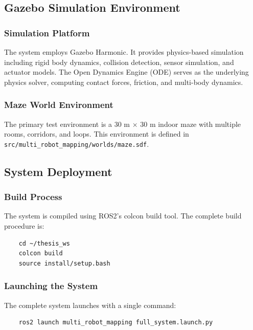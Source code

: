 \documentclass[11pt]{article}
\begin{document}
\subsection{Gazebo Simulation Environment}

\subsubsection{Simulation Platform}

The system employs Gazebo Harmonic. It provides physics-based simulation including rigid body dynamics, collision detection, sensor simulation, and actuator models. The Open Dynamics Engine (ODE) serves as the underlying physics solver, computing contact forces, friction, and multi-body dynamics.

\subsubsection{Maze World Environment}

The primary test environment is a 30 m × 30 m indoor maze with multiple rooms, corridors, and loops. This environment is defined in \texttt{src/multi\_robot\_mapping/worlds/maze.sdf}.

\subsection{System Deployment}

\subsubsection{Build Process}

The system is compiled using ROS2's colcon build tool. The complete build procedure is:

\begin{verbatim}
	cd ~/thesis_ws
	colcon build 
	source install/setup.bash
\end{verbatim}

\subsubsection{Launching the System}

The complete system launches with a single command:

\begin{verbatim}
	ros2 launch multi_robot_mapping full_system.launch.py
\end{verbatim}
\end{document}
